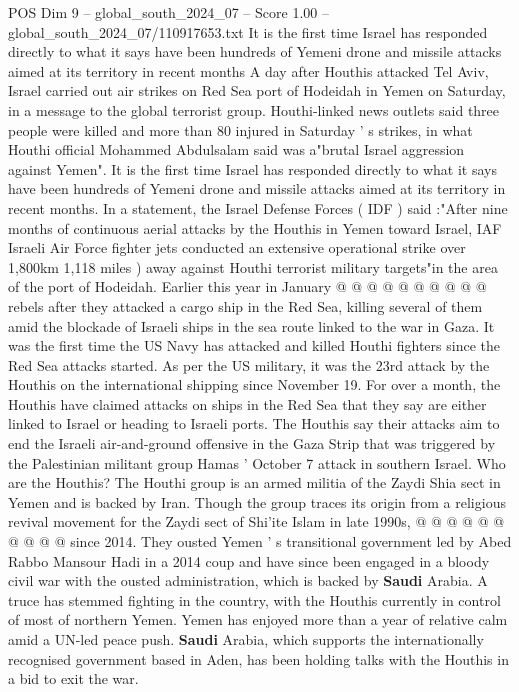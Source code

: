 \begin{textsample}{POS Dim 9 – global\_south\_2024\_07 – Score 1.00 – global\_south\_2024\_07/110917653.txt}  \label{ex:f9_pos_111}
It is the first time Israel has responded directly to what it says have been hundreds of Yemeni drone and missile attacks aimed at its territory in recent months A day after Houthis attacked Tel Aviv, Israel carried out air strikes on Red Sea port of Hodeidah in Yemen on Saturday, in a message to the global terrorist group.
Houthi-linked news outlets said three people were killed and more than 80 injured in Saturday ' s strikes, in what Houthi official Mohammed Abdulsalam said was a"brutal Israel aggression against Yemen".
It is the first time Israel has responded directly to what it says have been hundreds of Yemeni drone and missile attacks aimed at its territory in recent months.
In a statement, the Israel Defense Forces ( IDF ) said :"After nine months of continuous aerial attacks by the Houthis in Yemen toward Israel, IAF Israeli Air Force fighter jets conducted an extensive operational strike over 1,800km 1,118 miles ) away against Houthi terrorist military targets"in the area of the port of Hodeidah.
Earlier this year in January @ @ @ @ @ @ @ @ @ @ rebels after they attacked a cargo ship in the Red Sea, killing several of them amid the blockade of Israeli ships in the sea route linked to the war in Gaza.
It was the first time the US Navy has attacked and killed Houthi fighters since the Red Sea attacks started.
As per the US military, it was the 23rd attack by the Houthis on the international shipping since November 19.
For over a month, the Houthis have claimed attacks on ships in the Red Sea that they say are either linked to Israel or heading to Israeli ports.
The Houthis say their attacks aim to end the Israeli air-and-ground offensive in the Gaza Strip that was triggered by the Palestinian militant group Hamas ' October 7 attack in southern Israel.
Who are the Houthis?
The Houthi group is an armed militia of the Zaydi Shia sect in Yemen and is backed by Iran.
Though the group traces its origin from a religious revival movement for the Zaydi sect of Shi'ite Islam in late 1990s, @ @ @ @ @ @ @ @ @ @ since 2014.
They ousted Yemen ' s transitional government led by Abed Rabbo Mansour Hadi in a 2014 coup and have since been engaged in a bloody civil war with the ousted administration, which is backed by \textbf{Saudi} Arabia.
A truce has stemmed fighting in the country, with the Houthis currently in control of most of northern Yemen.
Yemen has enjoyed more than a year of relative calm amid a UN-led peace push. \textbf{Saudi} Arabia, which supports the internationally recognised government based in Aden, has been holding talks with the Houthis in a bid to exit the war.

\end{textsample}
